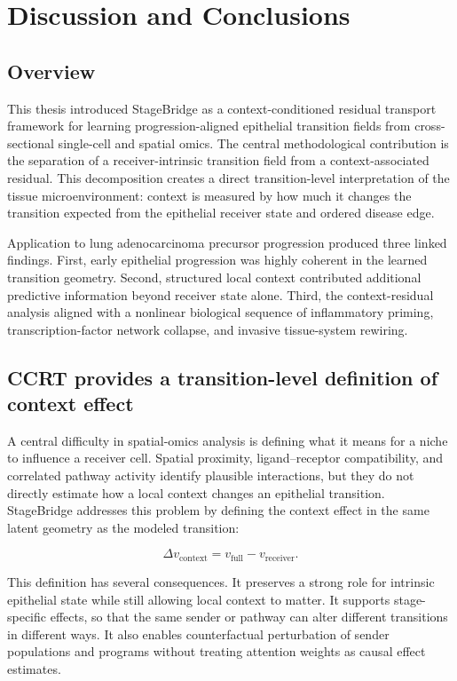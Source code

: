 \chapter{Discussion and Conclusions} \label{chap:discussion}

\section{Overview}

This thesis introduced StageBridge as a context-conditioned residual transport framework for learning progression-aligned epithelial transition fields from cross-sectional single-cell and spatial omics. The central methodological contribution is the separation of a receiver-intrinsic transition field from a context-associated residual. This decomposition creates a direct transition-level interpretation of the tissue microenvironment: context is measured by how much it changes the transition expected from the epithelial receiver state and ordered disease edge.

Application to lung adenocarcinoma precursor progression produced three linked findings. First, early epithelial progression was highly coherent in the learned transition geometry. Second, structured local context contributed additional predictive information beyond receiver state alone. Third, the context-residual analysis aligned with a nonlinear biological sequence of inflammatory priming, transcription-factor network collapse, and invasive tissue-system rewiring.

\section{CCRT provides a transition-level definition of context effect}

A central difficulty in spatial-omics analysis is defining what it means for a niche to influence a receiver cell. Spatial proximity, ligand--receptor compatibility, and correlated pathway activity identify plausible interactions, but they do not directly estimate how a local context changes an epithelial transition. StageBridge addresses this problem by defining the context effect in the same latent geometry as the modeled transition:

\begin{equation}
\Delta v_{\mathrm{context}}
=
v_{\mathrm{full}}-v_{\mathrm{receiver}}.
\end{equation}

This definition has several consequences. It preserves a strong role for intrinsic epithelial state while still allowing local context to matter. It supports stage-specific effects, so that the same sender or pathway can alter different transitions in different ways. It also enables counterfactual perturbation of sender populations and programs without treating attention weights as causal effect estimates.

